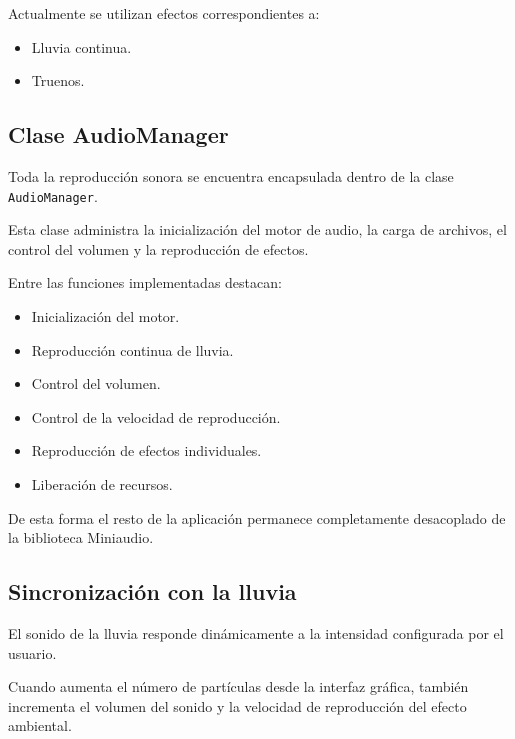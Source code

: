 Actualmente se utilizan efectos correspondientes a:

\begin{itemize}

\item Lluvia continua.

\item Truenos.

\end{itemize}

\subsection{Clase AudioManager}

Toda la reproducción sonora se encuentra encapsulada dentro de la clase \texttt{AudioManager}.

Esta clase administra la inicialización del motor de audio, la carga de archivos, el control del volumen y la reproducción de efectos.

Entre las funciones implementadas destacan:

\begin{itemize}

\item Inicialización del motor.

\item Reproducción continua de lluvia.

\item Control del volumen.

\item Control de la velocidad de reproducción.

\item Reproducción de efectos individuales.

\item Liberación de recursos.

\end{itemize}

De esta forma el resto de la aplicación permanece completamente desacoplado de la biblioteca Miniaudio.

\subsection{Sincronización con la lluvia}

El sonido de la lluvia responde dinámicamente a la intensidad configurada por el usuario.

Cuando aumenta el número de partículas desde la interfaz gráfica, también incrementa el volumen del sonido y la velocidad de reproducción del efecto ambiental.

